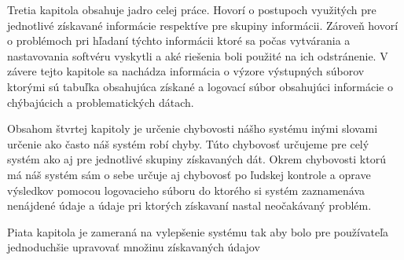Tretia kapitola obsahuje jadro celej práce. Hovorí o postupoch využitých pre jednotlivé získavané informácie respektíve pre skupiny informácii. Zároveň hovorí o problémoch pri hľadaní týchto informácii ktoré sa počas vytvárania a nastavovania softvéru vyskytli a aké riešenia boli použité na ich odstránenie. V závere tejto kapitole sa nachádza informácia o výzore výstupných súborov ktorými sú tabuľka obsahujúca získané a logovací súbor obsahujúci informácie o chýbajúcich a problematických dátach. 

Obsahom štvrtej kapitoly je určenie chybovosti nášho systému inými slovami určenie ako často náš systém robí chyby. Túto chybovosť určujeme pre celý systém ako aj pre jednotlivé skupiny získavaných dát. Okrem chybovosti ktorú má náš systém sám o sebe určuje aj chybovosť po ľudskej kontrole a oprave výsledkov pomocou logovacieho súboru do ktorého si systém zaznamenáva nenájdené údaje a údaje pri ktorých získavaní nastal neočakávaný problém.

Piata kapitola je zameraná na vylepšenie systému tak aby bolo pre používateľa jednoduchšie upravovať množinu získavaných údajov 

